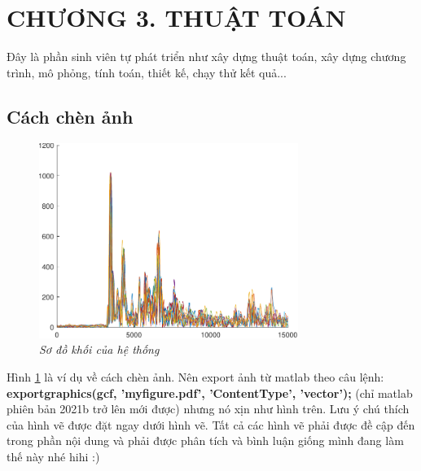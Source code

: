 \section*{\centering CHƯƠNG 3. THUẬT TOÁN}
\setcounter{section}{3}
\setcounter{subsection}{0}
\setcounter{figure}{0}
\setcounter{table}{0}
Đây \cite{stein2011fourier} là phần sinh viên tự phát triển như xây dựng thuật toán, xây dựng chương trình, mô phỏng, tính toán, thiết kế, chạy thử kết quả... \cite{howell2016principles}
\subsection{Cách chèn ảnh}
\begin{figure}[H]
    \centering
    \includegraphics[width=0.75\textwidth]{Images/signal.pdf}
    \caption[Sơ đồ khối của hệ thống]{\textit{\fontsize{12pt}{0}\selectfont Sơ đồ khối của hệ thống}}
    \label{hinh31}
\end{figure}
Hình \ref{hinh31} là ví dụ về cách chèn ảnh. Nên export ảnh từ matlab theo câu lệnh: \textbf{exportgraphics(gcf, 'myfigure.pdf', 'ContentType', 'vector');} (chỉ matlab phiên bản 2021b trở lên mới được) nhưng nó xịn như hình trên. Lưu ý chú thích của hình vẽ được đặt ngay dưới hình vẽ. Tất cả các hình vẽ phải được đề cập đến trong phần nội dung và phải được phân tích và bình luận giống mình đang làm thế này nhé hihi :)

